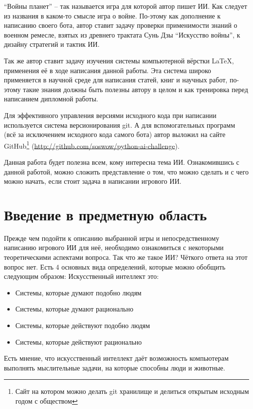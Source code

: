 \documentclass[12pt]{report}
\newenvironment{myItemize}{
	\begin{itemize}
  		\setlength{\itemsep}{1pt}
  		\setlength{\parskip}{0pt}
  		\setlength{\parsep}{0pt}
}{\end{itemize}}
\begin{document}
``Войны планет'' -- так называется игра для которой автор пишет ИИ. Как следует из названия в каком-то смысле игра о войне. По-этому как дополнение к написанию своего бота, автор ставит задачу проверки применимости знаний о военном ремесле, взятых из древнего трактата Сунь Дзы ``Искусство войны'', к дизайну стратегий и тактик ИИ.

Так же автор ставит задачу изучения системы компьютерной вёрстки \LaTeX, применения её в ходе написания данной работы. Эта система широко применяется в научной среде для написания статей, книг и научных работ, по-этому такие знания должны быть полезны автору в целом и как тренировка перед написанием дипломной работы.

Для эффективного управления версиями исходного кода при написании используется система версионирования git. А для вспомогательных программ (всё за исключением исходного кода самого бота) автор выложил на сайте GitHub\footnote{Сайт на котором можно делать git хранилище и делиться открытым исходным годом с обществом} (\url{http://github.com/soswow/python-ai-challenge}).

Данная работа будет полезна всем, кому интересна тема ИИ. Ознакомившись с данной работой, можно сложить представление о том, что можно сделать и с чего можно начать, если стоит задача в написании игрового ИИ.

\chapter{Введение в предметную область}
\thispagestyle{fancy}
Прежде чем подойти к описанию выбранной игры и непосредственному написанию игрового ИИ для неё, необходимо ознакомиться с некоторыми теоретическими аспектами вопроса.
Так что же такое ИИ? Чёткого ответа на этот вопрос нет. Есть 4 основных вида определений, которые можно обобщить следующим образом: \citep{russell1995} Искусственный интеллект это:
\begin{myItemize}
\item Системы, которые думают подобно людям
\item Системы, которые думают рационально
\item Системы, которые действуют подобно людям
\item Системы, которые действуют рационально
\end{myItemize}
Есть мнение, что искусственный интеллект даёт возможность компьютерам выполнять мыслительные задачи, на которые способны люди и животные.\citep{millington2009} 
\end{document}
